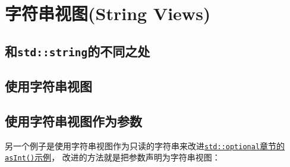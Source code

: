 \section{字符串视图(String Views)}\label{ch19}

\subsection{和\texttt{std::string}的不同之处}

\subsection{使用字符串视图}

\subsection{使用字符串视图作为参数}

\label{改进asInt}
另一个例子是使用字符串视图作为只读的字符串来改进\hyperref[ch15.1.1]
{\texttt{std::optional}章节的\texttt{asInt()}示例}，
改进的方法就是把参数声明为字符串视图：
